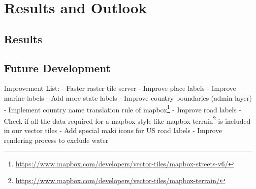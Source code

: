 \chapter{Results and Outlook}\label{results-and-outlook-1}

\section{Results}\label{results}

\section{Future Development}\label{future-development}

Improvement List:
- Faster raster tile server
- Improve place labels
- Improve marine labels
- Add more state labels
- Improve country boundaries (admin layer)
- Implement country name translation rule of mapbox\footnote{\url{https://www.mapbox.com/developers/vector-tiles/mapbox-streets-v6/}}
- Improve road labels
- Check if all the data required for a mapbox style like mapbox terrain\footnote{\url{https://www.mapbox.com/developers/vector-tiles/mapbox-terrain/}} is included in our vector tiles
- Add special maki icons for US road labels
- Improve rendering process to exclude water

\newpage{}